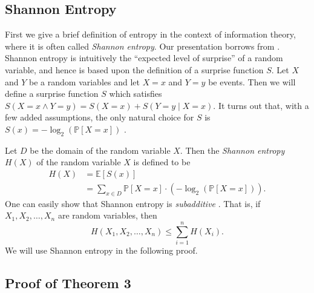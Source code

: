 \documentclass[12pt, a4paper]{article}
\begin{document}
\subsection{Shannon Entropy}\label{ssec:shannonEntropy}
First we give a brief definition of entropy in the context of information theory, where it is often called \textit{Shannon entropy}. Our presentation %
 borrows from \cite{DG14}. Shannon entropy is intuitively the ``expected level of surprise'' of a random variable, and hence is based upon the definition of a surprise function $S$. Let $X$ and $Y$ be a random variables and let $X=x$ and $Y=y$ be events. Then we will define a surprise function $S$ which satisfies $S(X=x\land Y=y) = S(X=x) + S(Y=y\mid X=x)$. It turns out that, with a few added assumptions, the only natural choice for $S$ is $S(x) = -\log_2(\mathbb{P}[X = x])$ \cite{DG14}.

Let $D$ be the domain of the random variable $X$. Then the \textit{Shannon entropy} $H(X)$ of the random variable $X$ is defined to be
\begin{align*}
	H(X)
	& = \mathbb{E}[S(x)]\\
	& = \sum_{x\in D}\mathbb{P}[X=x]\cdot (-\log_2(\mathbb{P}[X=x])).
\end{align*}
One can easily show that Shannon entropy is \textit{subadditive} \cite{DG14}. That is, if $X_1, X_2, \ldots, X_n$ are random variables, then
	\begin{equation}\label{subadditivityDefinition}
			H(X_1, X_2, \ldots, X_n)\le \sum_{i=1}^{n}H(X_i).
	\end{equation}
We will use Shannon entropy in the following proof.

\subsection{Proof of Theorem 3}
\end{document}
